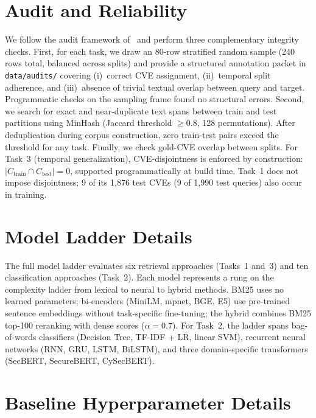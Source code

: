 \documentclass{article}
\begin{document}
\section{Audit and Reliability}
\label{app:audit-reliability}

We follow the audit framework of~\citet{kapoor2023leakage} and perform three complementary integrity checks. First, for each task, we draw an 80-row stratified random sample (240 rows total, balanced across splits) and provide a structured annotation packet in \texttt{data/audits/} covering (i)~correct CVE assignment, (ii)~temporal split adherence, and (iii)~absence of trivial textual overlap between query and target. Programmatic checks on the sampling frame found no structural errors. Second, we search for exact and near-duplicate text spans between train and test partitions using MinHash (Jaccard threshold $\geq$0.8, 128 permutations). After deduplication during corpus construction, zero train-test pairs exceed the threshold for any task. Finally, we check gold-CVE overlap between splits. For Task~3 (temporal generalization), CVE-disjointness is enforced by construction: $|C_{\text{train}} \cap C_{\text{test}}| = 0$, supported programmatically at build time. Task~1 does not impose disjointness; 9 of its 1,876 test CVEs (9 of 1,990 test queries) also occur in training.

\section{Model Ladder Details}
\label{app:model-ladder}

The full model ladder evaluates six retrieval approaches (Tasks~1 and~3) and ten classification approaches (Task~2). Each model represents a rung on the complexity ladder from lexical to neural to hybrid methods. BM25 uses no learned parameters; bi-encoders (MiniLM, mpnet, BGE, E5) use pre-trained sentence embeddings without task-specific fine-tuning; the hybrid combines BM25 top-100 reranking with dense scores ($\alpha{=}0.7$). For Task~2, the ladder spans bag-of-words classifiers (Decision Tree, TF-IDF + LR, linear SVM), recurrent neural networks (RNN, GRU, LSTM, BiLSTM), and three domain-specific transformers (SecBERT, SecureBERT, CySecBERT).

\section{Baseline Hyperparameter Details}
\label{app:hyperparams}
\end{document}
